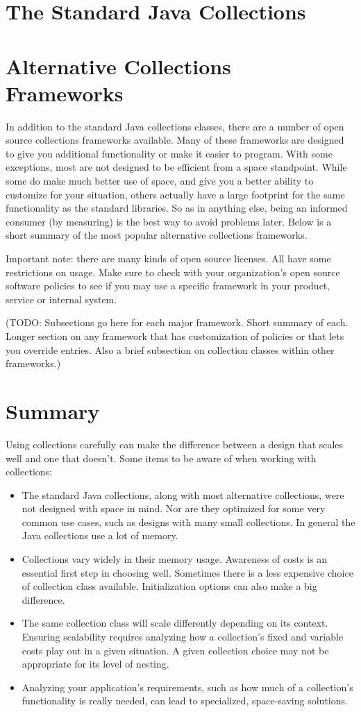 \section{The Standard Java Collections}
\section{Alternative Collections Frameworks}
In addition to the standard Java collections classes, there are a number of
open source collections frameworks available. Many of these frameworks
are designed to give you additional functionality or make it easier to
program. With some exceptions, most are not designed to be efficient from a
space standpoint. While some do make much better use of space, and give you a
better ability to customize for your situation, others actually have a
large footprint for the same functionality as the standard libraries. So as in
anything else, being an informed consumer (by measuring) is the best way to
avoid problems later. Below is a short summary of the most
popular alternative collections frameworks.

Important note: there are many kinds of open source licenses. All have some
restrictions on usage. Make sure to check with your organization's open
source software policies to see if you may use a specific framework in 
your product, service or internal system.

(TODO: Subsections go here for each major framework. Short summary of each.
Longer section on any framework that has customization of policies or that lets you override
entries. Also a brief subsection on collection classes within other frameworks.)

\section{Summary}
Using collections carefully can
make the difference between a design that scales well and one that
doesn't. Some items to be aware of when working with collections:
\begin{itemize}
  \item The standard Java collections, along with most alternative
  collections, were not designed with space in mind. Nor are they optimized 
  for some very common use cases, such as designs with many small collections.
  In general the Java collections use a lot of memory.
  \item Collections vary widely in their memory usage. Awareness of
  costs is an essential first step in choosing well. Sometimes there is a less
  expensive choice of collection class available. Initialization options
  can also make a big difference.
  \item The same collection class will scale differently depending on its
  context. Ensuring scalability requires
  analyzing how a collection's fixed and variable costs
  play out in a given situation. A given collection choice may not be appropriate for its level of nesting.
  \item Analyzing your application's requirements, such as 
  how much of a collection's functionality is really needed, can lead to
  specialized, space-saving solutions.
\end{itemize}
